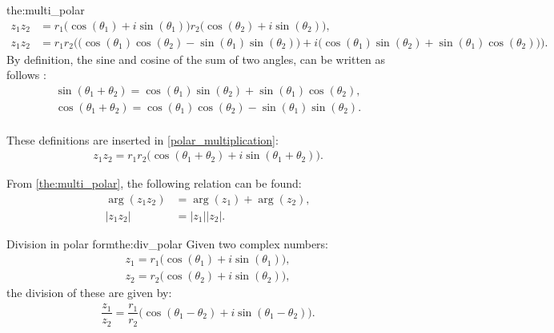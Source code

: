 \begin{prof}{}{the:multi_polar}
\begin{align}
z_1 z_2&=r_1 \big( \cos(\theta_1)+ i \sin(\theta_1)\big)r_2 \big( \cos(\theta_2)+ i \sin(\theta_2)\big), \nonumber
\\
\label{polar_multiplication}
z_1z_2&=r_1r_2\Big( \big(\cos(\theta_1)\cos(\theta_2)-\sin(\theta_1) \sin(\theta_2)\big)+i\big(\cos(\theta_1)\sin(\theta_2)+\sin(\theta_1)\cos(\theta_2)\big)\Big).
\end{align}
By definition, the sine and cosine of the sum of two angles, can be written as follows \cite[p. A-14 Appendicies]{calc}:
\\
\begin{align} 
\sin(\theta_1+\theta_2)=\cos(\theta_1)\sin(\theta_2)+\sin(\theta_1)\cos(\theta_2), \label{sum_cos_sin}
\end{align}
\begin{align*}
\cos(\theta_1+\theta_2)=\cos(\theta_1)\cos(\theta_2)-\sin(\theta_1)\sin(\theta_2).
\end{align*}
\\
These definitions are inserted in \eqref{polar_multiplication}:
\\
\begin{align*}
z_1 z_2=r_1r_2\big( \cos(\theta_1+\theta_2)+ i \sin(\theta_1+\theta_2)\big).
\end{align*}
\end{prof}
\noindent
From  \eqref{the:multi_polar}, the following relation can be found:
\begin{align}
\arg(z_1z_2)&=\arg(z_1)+\arg(z_2),
\\
|z_1z_2|&=|z_1||z_2|.
\end{align}

\begin{theorem}{Division in polar form}{the:div_polar}
Given two complex numbers:
\begin{align*}
z_1=r_1\big(\cos(\theta_1)+i\sin(\theta_1)\big), 
\\
z_2=r_2\big(\cos(\theta_2)+i\sin(\theta_2)\big),
\end{align*}
the division of these are given by:
\begin{align*}
\dfrac{z_1}{z_2}=\dfrac{r_1}{r_2}\Big( \cos(\theta_1-\theta_2)+ i \sin(\theta_1-\theta_2)\Big).
\end{align*}
\end{theorem}


